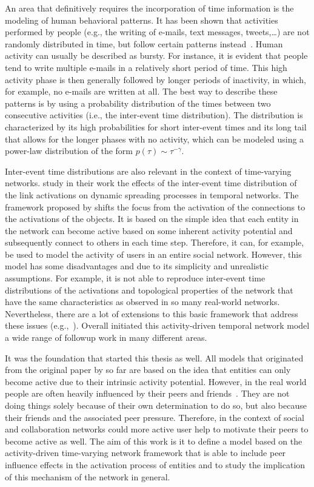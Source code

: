 An area that definitively requires the incorporation of time information is the modeling of human behavioral patterns.
It has been shown that activities performed by people (e.g., the writing of e-mails, text messages, tweets,\ldots) are not randomly distributed in time, but follow certain patterns instead~\cite{Barabasi2005}.
Human activity can usually be described as bursty.
For instance, it is evident that people tend to write multiple e-mails in a relatively short period of time.
This high activity phase is then generally followed by longer periods of inactivity, in which, for example, no e-mails are written at all.
The best way to describe these patterns is by using a probability distribution of the times between two consecutive activities (i.e., the inter-event time distribution).
The distribution is characterized by its high probabilities for short inter-event times and its long tail that allows for the longer phases with no activity, which can be modeled using a power-law distribution of the form \( p(\tau) \sim \tau^{-\gamma} \).

Inter-event time distributions are also relevant in the context of time-varying networks.
\citet{Lambiotte2013} study in their work the effects of the inter-event time distribution of the link activations on dynamic spreading processes in temporal networks.
The framework proposed by \citet{Perra2012a} shifts the focus from the activation of the connections to the activations of the objects.
It is based on the simple idea that each entity in the network can become active based on some inherent activity potential and subsequently connect to others in each time step.
Therefore, it can, for example, be used to model the activity of users in an entire social network.
However, this model has some disadvantages and due to its simplicity and unrealistic assumptions.
For example, it is not able to reproduce inter-event time distributions of the activations and topological properties of the network that have the same characteristics as observed in so many real-world networks.
Nevertheless, there are a lot of extensions to this basic framework that address these issues (e.g.,~\cite{Laurent2015, Moinet2015, Moinet2016}).
Overall initiated this activity-driven temporal network model a wide range of followup work in many different areas.

It was the foundation that started this thesis as well.
All models that originated from the original paper by \citet{Perra2012a} so far are based on the idea that entities can only become active due to their intrinsic activity potential.
 However, in the real world people are often heavily influenced by their peers and friends~\cite{Walk2016}.
They are not doing things solely because of their own determination to do so, but also because their friends and the associated peer pressure.
Therefore, in the context of social and collaboration networks could more active user help to motivate their peers to become active as well.
The aim of this work is it to define a model based on the activity-driven time-varying network framework that is able to include peer influence effects in the activation process of entities and to study the implication of this mechanism of the network in general.


